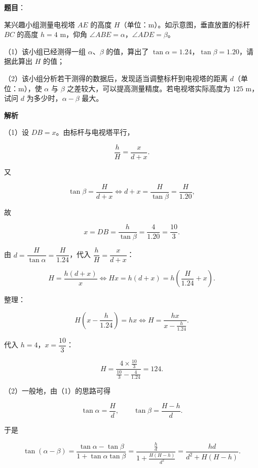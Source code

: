\begin{answer}

\textbf{题目}：

某兴趣小组测量电视塔 $AE$ 的高度 $H$（单位：m）。如示意图，垂直放置的标杆 $BC$ 的高度 $h=4$ m，仰角 $\angle ABE=\alpha$，$\angle ADE=\beta$。

（1）该小组已经测得一组 $\alpha$、$\beta$ 的值，算出了 $\tan\alpha=1.24$，$\tan\beta=1.20$，请据此算出 $H$ 的值；

（2）该小组分析若干测得的数据后，发现适当调整标杆到电视塔的距离 $d$（单位：m），使 $\alpha$ 与 $\beta$ 之差较大，可以提高测量精度。若电视塔实际高度为 $125$ m，试问 $d$ 为多少时，$\alpha-\beta$ 最大。
\nopagebreak[4]
\begin{center}\end{center}
\nopagebreak[4]
\textbf{解析}

（1）设 $DB=x$。由标杆与电视塔平行，

\nopagebreak[4]
\[\frac hH=\frac{x}{d+x}.\]

又

\nopagebreak[4]
\[\tan\beta=\frac H{d+x}\iff d+x=\frac H{\tan\beta}=\frac H{1.20},\]

故

\nopagebreak[4]
\[x=DB=\frac h{\tan\beta}=\frac4{1.20}=\frac{10}3.\]

由 $d=\dfrac H{\tan\alpha}=\dfrac H{1.24}$，代入 $\dfrac hH=\dfrac x{d+x}$：

\nopagebreak[4]
\[H=\frac{h(d+x)}x
\iff Hx=h(d+x)=h\left(\frac H{1.24}+x\right).\]

整理：

\nopagebreak[4]
\[H\left(x-\frac h{1.24}\right)=hx
\iff H=\frac{hx}{x-\frac h{1.24}}.\]

代入 $h=4$，$x=\dfrac{10}3$：

\nopagebreak[4]
\[H=\frac{4\times\frac{10}3}{\frac{10}3-\frac4{1.24}}=124.\]

（2）一般地，由（1）的思路可得

\nopagebreak[4]
\[\tan\alpha=\frac Hd,\qquad \tan\beta=\frac{H-h}{d}.\]

于是

\nopagebreak[4]
\[\tan(\alpha-\beta)
=\frac{\tan\alpha-\tan\beta}{1+\tan\alpha\tan\beta}
=\frac{\frac hd}{1+\frac{H(H-h)}{d^2}}
=\frac{hd}{d^2+H(H-h)}.\]


\end{answer}
